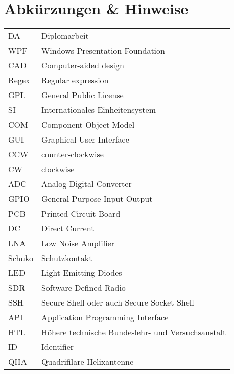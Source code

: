 \section*{Abkürzungen \& Hinweise}
\begin{singlespace}
	\begin{tabular}{ll}
		DA     & Diplomarbeit \\
		WPF    & Windows Presentation Foundation \\
		CAD    & Computer-aided design \\
		Regex  & Regular expression \\
		GPL    & General Public License  \\
		SI     & Internationales Einheitensystem \\
		COM    & Component Object Model \\
		GUI    & Graphical User Interface \\
		CCW	   & counter-clockwise \\
		CW     & clockwise \\
		ADC	   & Analog-Digital-Converter \\
		GPIO   & General-Purpose Input Output \\
		PCB	   & Printed Circuit Board \\
		DC     & Direct Current \\
		LNA    & Low Noise Amplifier \\
		Schuko & Schutzkontakt \\
		LED	   & Light Emitting Diodes \\
		SDR    & Software Defined Radio \\
		SSH    & Secure Shell oder auch Secure Socket Shell \\
		API    & Application Programming Interface \\
		HTL    & Höhere technische Bundeslehr- und Versuchsanstalt \\
		ID     & Identifier \\
		QHA    & Quadrifilare Helixantenne \\
	\end{tabular}
\end{singlespace}

\pagebreak
